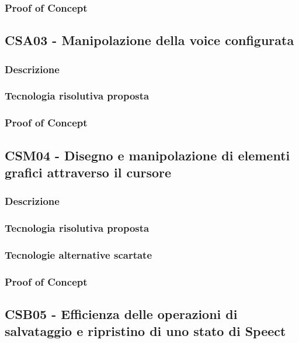 \documentclass[./../Technology Baseline.tex]{subfiles}
\begin{document}
\subsubsection{Proof of Concept}

\subsection{CSA03 - Manipolazione della voice configurata}

\subsubsection{Descrizione}

\subsubsection{Tecnologia risolutiva proposta}

\subsubsection{Proof of Concept}

\subsection{CSM04 - Disegno e manipolazione di elementi grafici attraverso il cursore}

\subsubsection{Descrizione}

\subsubsection{Tecnologia risolutiva proposta}

\subsubsection{Tecnologie alternative scartate}

\subsubsection{Proof of Concept}

\subsection{CSB05 - Efficienza delle operazioni di salvataggio e ripristino di uno stato di Speect}
\end{document}
